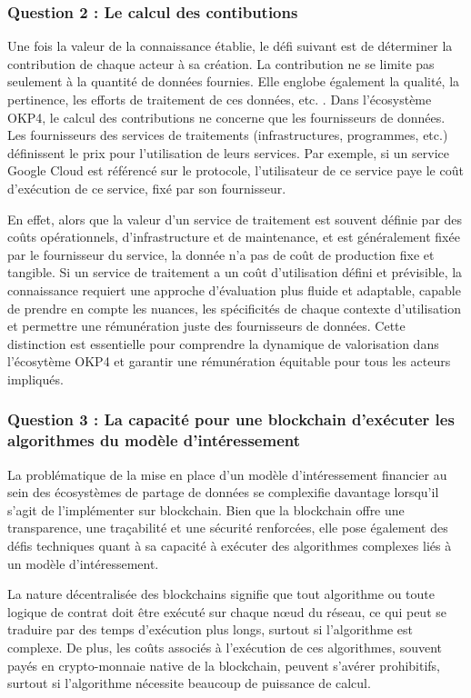 \subsubsection{Question 2 : Le calcul des contibutions}\label{subsubsec:q2}
Une fois la valeur de la connaissance établie, le défi suivant est de déterminer la contribution de chaque acteur à sa création. La contribution ne se limite pas seulement à la quantité de données fournies. Elle englobe également la qualité, la pertinence, les efforts de traitement de ces données, etc. . Dans l'écosystème OKP4, le calcul des contributions ne concerne que les fournisseurs de données. Les fournisseurs des services de traitements (infrastructures, programmes, etc.)  définissent le prix pour l'utilisation de leurs services.
Par exemple, si un service Google Cloud est référencé sur le protocole, l'utilisateur de ce service paye le coût d'exécution de ce service, fixé par son fournisseur. 

En effet, alors que la valeur d'un service de traitement est souvent définie par des coûts opérationnels, d'infrastructure et de maintenance, et est généralement fixée par le fournisseur du service, la donnée n'a pas de coût de production fixe et tangible. Si un service de traitement a un coût d'utilisation défini et prévisible, la connaissance requiert une approche d'évaluation plus fluide et adaptable, capable de prendre en compte les nuances, les spécificités de chaque contexte d'utilisation et permettre une rémunération juste des fournisseurs de données. Cette distinction est essentielle pour comprendre la dynamique de valorisation dans l'écosytème OKP4 et garantir une rémunération équitable pour tous les acteurs impliqués.

\subsubsection{Question 3 : La capacité pour une blockchain d'exécuter les algorithmes du modèle d'intéressement}\label{subsubsec:q3}

La problématique de la mise en place d'un modèle d'intéressement financier au sein des écosystèmes de partage de données se complexifie davantage lorsqu'il s'agit de l'implémenter sur blockchain. Bien que la blockchain offre une transparence, une traçabilité et une sécurité renforcées, elle pose également des défis techniques quant à sa capacité à exécuter des algorithmes complexes liés à un modèle d'intéressement.

La nature décentralisée des blockchains signifie que tout algorithme ou toute logique de contrat doit être exécuté sur chaque nœud du réseau, ce qui peut se traduire par des temps d'exécution plus longs, surtout si l'algorithme est complexe. De plus, les coûts associés à l'exécution de ces algorithmes, souvent payés en crypto-monnaie native de la blockchain, peuvent s'avérer prohibitifs, surtout si l'algorithme nécessite beaucoup de puissance de calcul.

